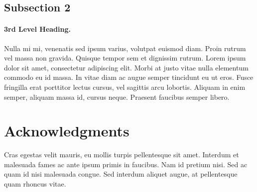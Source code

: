 \documentclass[10pt,letterpaper]{article}
\begin{document}
\subsection*{Subsection 2}
\paragraph{3rd Level Heading.} Nulla mi mi, venenatis sed ipsum varius, volutpat euismod diam. Proin rutrum vel massa non gravida. Quisque tempor sem et dignissim rutrum. Lorem ipsum dolor sit amet, consectetur adipiscing elit. Morbi at justo vitae nulla elementum commodo eu id massa. In vitae diam ac augue semper tincidunt eu ut eros. Fusce fringilla erat porttitor lectus cursus, vel sagittis arcu lobortis. Aliquam in enim semper, aliquam massa id, cursus neque. Praesent faucibus semper libero.

\section*{Acknowledgments}
Cras egestas velit mauris, eu mollis turpis pellentesque sit amet. Interdum et malesuada fames ac ante ipsum primis in faucibus. Nam id pretium nisi. Sed ac quam id nisi malesuada congue. Sed interdum aliquet augue, at pellentesque quam rhoncus vitae.

\nolinenumbers
\end{document}
